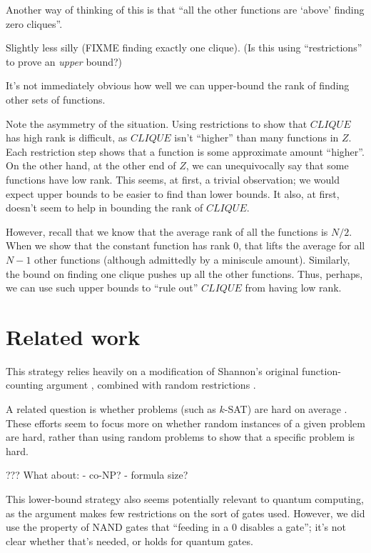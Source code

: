 \documentclass[12pt]{article}
\theoremstyle{definition}
\begin{document}
Another way of thinking of this is that ``all the other functions
are `above' finding zero cliques''.

Slightly less silly (FIXME finding exactly one clique).
(Is this using ``restrictions'' to prove an {\em upper} bound?)

It's not immediately obvious how well we can upper-bound the rank
of finding other sets of functions.

Note the asymmetry of the situation. Using restrictions to show that
$CLIQUE$ has high rank is difficult, as $CLIQUE$ isn't ``higher'' than
many functions in $Z$. Each restriction step shows that a function is
some approximate amount ``higher''.
On the other hand, at the other end of $Z$, we can unequivocally say
that some functions have low rank.
This seems, at first, a trivial observation; we would expect upper bounds
to be easier to find than lower bounds. It also, at first, doesn't seem
to help in bounding the rank of $CLIQUE$.

However, recall that we know that the average rank of all the functions
is $N/2$.
When we show that the constant function has rank 0, that lifts
the average for all $N-1$ other functions (although admittedly
by a miniscule amount).
Similarly, the bound on finding one clique pushes up all the other functions.
Thus, perhaps, we can use such upper bounds to ``rule out'' $CLIQUE$ from
having low rank.

\section{Related work}

This strategy relies heavily on a modification of Shannon's original
function-counting argument \cite{shannon_synthesis_1949},
combined with random restrictions
\cite{subbotovskaya1963comparison} \cite{hastad1987lower}.

A related question is whether problems
(such as $k$-SAT) are
hard on average \cite{bogdanov2006average}.
These efforts seem to focus more on whether
random
instances of a given problem are hard, rather
than using random problems to show that
a specific problem is hard.

??? What about:
- co-NP?
- formula size?


This lower-bound strategy also seems potentially
relevant to quantum computing,
as the argument makes few restrictions on the sort of gates used.
However, we did use the property of NAND gates that ``feeding in
a 0 disables a gate''; it's not clear whether that's needed,
or holds for quantum gates.
\end{document}

